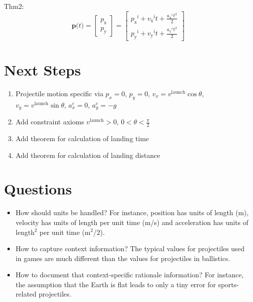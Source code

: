 \documentclass{article}
\begin{document}
Thm2: \begin{displaymath}
    \mathbf{p}\text{(}t\text{)}=\begin{bmatrix}
        p_\text{x}\\
        p_\text{y}
        \end{bmatrix} = \begin{bmatrix}
                               {{p_{\text{x}}}^{\text{i}}}+{{v_{\text{x}}}^{\text{i}}} t+\frac{{{a_{\text{x}}}^{\text{c}}} t^{2}}{2}\\
                               {{p_{\text{y}}}^{\text{i}}}+{{v_{\text{y}}}^{\text{i}}} t+\frac{{{a_{\text{y}}}^{\text{c}}} t^{2}}{2}
                               \end{bmatrix}
    \end{displaymath}

\section{Next Steps}

\begin{enumerate}
    \item Projectile motion specific via $p_x = 0$, $p_y = 0$, $v_x = v^{\text{launch}} \cos \theta$, $v_y = v^{\text{launch}} \sin \theta$, $a_x^c = 0$, $a_y^c = -g$
    \item Add constraint axioms $v^{\text{launch}} > 0$, $0 < \theta < \frac{\pi} {2}$
    \item Add theorem for calculation of landing time
    \item Add theorem for calculation of landing distance
\end{enumerate}

\section{Questions}

\begin{itemize}
    \item How should units be handled?  For instance, position has units of
    length (m), velocity has units of length per unit time (m/s) and
    acceleration has units of length$^2$ per unit time (m$^2$/2).
    \item How to capture context information?  The typical values for
    projectiles used in games are much different than the values for projectiles
    in ballistics.
    \item How to document that context-specific rationale information?  For
    instance, the assumption that the Earth is flat leads to only a tiny error
    for sports-related projectiles.
\end{itemize}
\end{document}
